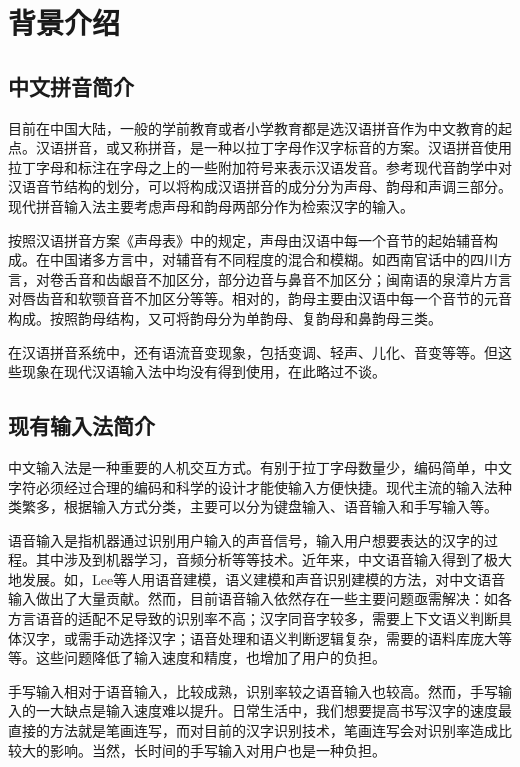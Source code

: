 \chapter{背景介绍}
  \section{中文拼音简介\label{sec:intro}}

  目前在中国大陆，一般的学前教育或者小学教育都是选汉语拼音作为中文教育的起点。汉语拼音，或又称拼音，是一种以拉丁字母作汉字标音的方案。\supercite{wjm}汉语拼音使用拉丁字母和标注在字母之上的一些附加符号来表示汉语发音。参考现代音韵学中对汉语音节结构的划分，可以将构成汉语拼音的成分分为声母、韵母和声调三部分。现代拼音输入法主要考虑声母和韵母两部分作为检索汉字的输入。

  按照汉语拼音方案《声母表》中的规定，声母由汉语中每一个音节的起始辅音构成。在中国诸多方言中，对辅音有不同程度的混合和模糊。如西南官话中的四川方言，对卷舌音和齿龈音不加区分，部分边音与鼻音不加区分；闽南语的泉漳片方言对唇齿音和软颚音音不加区分等等。\supercite{jdp}相对的，韵母主要由汉语中每一个音节的元音构成。按照韵母结构，又可将韵母分为单韵母、复韵母和鼻韵母三类。

  在汉语拼音系统中，还有语流音变现象，包括变调、轻声、儿化、音变等等。但这些现象在现代汉语输入法中均没有得到使用，在此略过不谈。

  \section{现有输入法简介\label{sec:current_input}}

  中文输入法是一种重要的人机交互方式。有别于拉丁字母数量少，编码简单，中文字符必须经过合理的编码和科学的设计才能使输入方便快捷。现代主流的输入法种类繁多，根据输入方式分类，主要可以分为键盘输入、语音输入和手写输入等。\supercite{wh}

  语音输入是指机器通过识别用户输入的声音信号，输入用户想要表达的汉字的过程。其中涉及到机器学习，音频分析等等技术。近年来，中文语音输入得到了极大地发展。如，Lee等人\supercite{lee5system, lee1997voice, lee1993mandarin}用语音建模，语义建模和声音识别建模的方法，对中文语音输入做出了大量贡献。然而，目前语音输入依然存在一些主要问题亟需解决：如各方言语音的适配不足导致的识别率不高\supercite{chen2000tone}；汉字同音字较多，需要上下文语义判断具体汉字，或需手动选择汉字；语音处理和语义判断逻辑复杂，需要的语料库庞大等等。这些问题降低了输入速度和精度，也增加了用户的负担。

  手写输入相对于语音输入，比较成熟，识别率较之语音输入也较高。然而，手写输入的一大缺点是输入速度难以提升。日常生活中，我们想要提高书写汉字的速度最直接的方法就是笔画连写，而对目前的汉字识别技术，笔画连写会对识别率造成比较大的影响。\supercite{srihari2007offline}当然，长时间的手写输入对用户也是一种负担。

